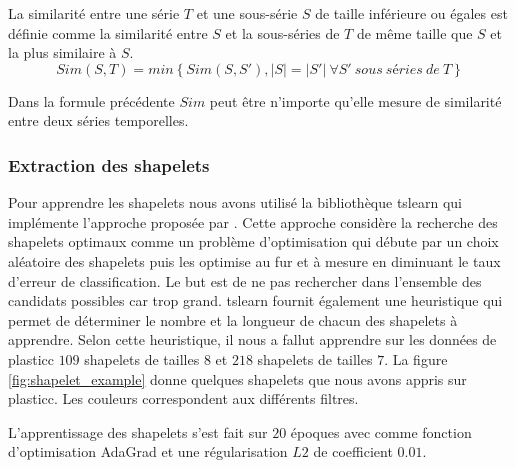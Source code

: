 La similarité entre une série $ T $ et une sous-série $ S $ de taille inférieure ou égales est définie comme la similarité entre $ S $ et la sous-séries de $ T $ de même taille que $ S $ et la plus similaire à $ S $. 
$$
Sim(S, T) = min \left \{ Sim(S, S'), |S|=|S'| \:  \forall S'\: sous \: séries \: de \: T \right \}
$$

Dans la formule précédente $ Sim $ peut être n'importe qu'elle mesure de similarité entre deux séries temporelles. 

\subsubsection{Extraction des shapelets}
Pour apprendre les shapelets nous avons utilisé la bibliothèque tslearn\citep{tslearn} qui implémente l'approche proposée par \citet{grabocka2014learning}. Cette approche considère la recherche des shapelets optimaux comme un problème d'optimisation qui débute par un choix aléatoire des shapelets puis les optimise au fur et à mesure en diminuant le taux d'erreur de classification. Le but est de ne pas rechercher dans l'ensemble des candidats possibles car trop grand. tslearn fournit également une heuristique qui permet de déterminer le nombre et la longueur de chacun des shapelets à apprendre. Selon cette heuristique, il nous a fallut apprendre sur les données de plasticc $ 109 $ shapelets de tailles $ 8 $ et $ 218 $ shapelets de tailles $ 7 $. La figure \ref{fig:shapelet_example} donne quelques shapelets que nous avons appris sur plasticc. Les couleurs correspondent aux différents filtres.

L'apprentissage des shapelets s'est fait sur $ 20 $ époques avec comme fonction d'optimisation AdaGrad\cite{duchi2011adaptive} et une régularisation $L2$ de coefficient $ 0.01 $. 

